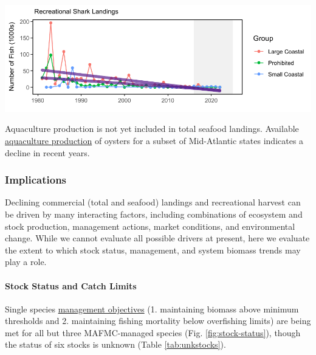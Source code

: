 \documentclass[
  10pt,
]{article}
\let\origfigure\figure
\let\endorigfigure\endfigure
\renewenvironment{figure}[1][2] {
    \expandafter\origfigure\expandafter[H]
} {
    \endorigfigure
}
\begin{document}
\begin{figure}

{\centering \includegraphics{midatlantic_files/figure-latex/rec-hms-1} 

}

\caption{Recreational shark landings from Marine Recreational Information Program (left) and Large Pelagics Survey (right) with declining trends (purple).}\label{fig:rec-hms}
\end{figure}

Aquaculture production is not yet included in total seafood landings. Available \href{https://noaa-edab.github.io/catalog/aquaculture.html}{aquaculture production} of oysters for a subset of Mid-Atlantic states indicates a decline in recent years.

\subsubsection{Implications}\label{implications}

Declining commercial (total and seafood) landings and recreational harvest can be driven by many interacting factors, including combinations of ecosystem and stock production, management actions, market conditions, and environmental change. While we cannot evaluate all possible drivers at present, here we evaluate the extent to which stock status, management, and system biomass trends may play a role.

\paragraph{Stock Status and Catch Limits}\label{stock-status-and-catch-limits}

Single species \href{https://noaa-edab.github.io/catalog/stock_status.html}{management objectives} (1. maintaining biomass above minimum thresholds and 2. maintaining fishing mortality below overfishing limits) are being met for all but three MAFMC-managed species (Fig. \ref{fig:stock-status}), though the status of six stocks is unknown (Table \ref{tab:unkstocks}).
\end{document}
